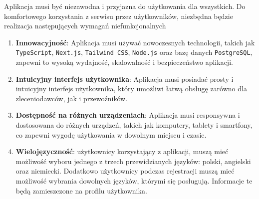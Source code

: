 Aplikacja musi być niezawodna i przyjazna do użytkowania dla wszystkich. Do komfortowego korzystania z serwisu przez użytkowników, niezbędna będzie realizacja następujących wymagań niefunkcjonalnych
\begin{enumerate}
    \item \textbf{Innowacyjność}: Aplikacja musi używać nowoczesnych technologii, takich jak \texttt{TypeScript}, \texttt{Next.js}, \texttt{Tailwind CSS}, \texttt{Node.js} oraz bazę danych \texttt{PostgreSQL}, zapewni to wysoką wydajność, skalowalność i bezpieczeństwo aplikacji.
    \item \textbf{Intuicyjny interfejs użytkownika}: Aplikacja musi posiadać prosty i intuicyjny interfejs użytkownika, który umożliwi łatwą obsługę zarówno dla zleceniodawców, jak i przewoźników.
    \item \textbf{Dostępność na różnych urządzeniach}: Aplikacja musi responsywna i dostosowana do różnych urządzeń, takich jak komputery, tablety i smartfony, co zapewni wygodę użytkowania w dowolnym miejscu i czasie.
    \item \textbf{Wielojęzyczność}: użytkownicy korzystający z aplikacji, muszą mieć możliwość wyboru jednego z trzech przewidzianych języków: polski, angielski oraz niemiecki. Dodatkowo użytkownicy podczas rejestracji muszą mieć możliwość wybrania dowolnych języków, którymi się posługują. Informacje te będą zamieszczone na profilu użytkownika.
\end{enumerate}
